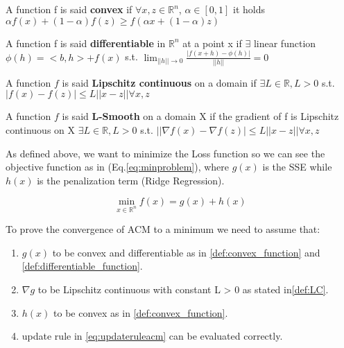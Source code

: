 \begin{definition}
    \label{def:convex_function}
    A function f is said \textbf{convex} if $\forall x, z \in \mathbb{R}^n$, $ \alpha \in [0,1] $ it holds $ \alpha f(x) + (1-\alpha )f(z) \geq f(\alpha x + (1- \alpha ) z)$
\end{definition}


\begin{definition}
    \label{def:differentiable_function}
    A function f is said \textbf{differentiable} in $\mathbb{R}^n$ at a point x if $\exists$ linear function $\phi(h) = <b,h> + f(x)$ s.t.
    $\lim_{||h|| \to 0} \frac{|f(x+h) - \phi (h)|}{||h||} = 0$
    
\end{definition}

\begin{definition}
    \label{def:LC}
    A function $f$ is said \textbf{Lipschitz continuous} on a domain if 
    $\exists L \in \mathbb{R}, L > 0$  s.t. $| f(x) - f(z)| \leq L|| x -z || \forall x,z  $
\end{definition}


\begin{definition}
    \label{def:Lsmooth}
    A function $f$ is said \textbf{L-Smooth} on a domain X if the gradient of f is Lipschitz continuous on X  
    $\exists L \in \mathbb{R}, L > 0$  s.t. $|| \nabla f(x) - \nabla f(z)| \leq L|| x -z || \forall x,z  $
\end{definition}



As defined above, we want to minimize the Loss function so we can see the objective function as in (Eq.\ref{eq:minproblem}), where $g(x)$ is the SSE while $h(x)$ is the penalization term (Ridge Regression).

\begin{equation}
\label{eq:minproblem}
\min_{x \in \mathbb{R}^n} f(x) = g(x) + h(x)
\end{equation}

To prove the convergence of ACM to a minimum we need to assume that: 

\begin{enumerate}

    \item $g(x)$ to be convex and differentiable as in \ref{def:convex_function} and \ref{def:differentiable_function}.
    \item $\nabla g$ to be Lipschitz continuous with constant L > 0  as stated in\ref{def:LC}.
    \item $h(x)$ to be convex as in \ref{def:convex_function}.
    \item update rule in \ref{eq:updateruleacm} can be evaluated correctly.
\end{enumerate}



